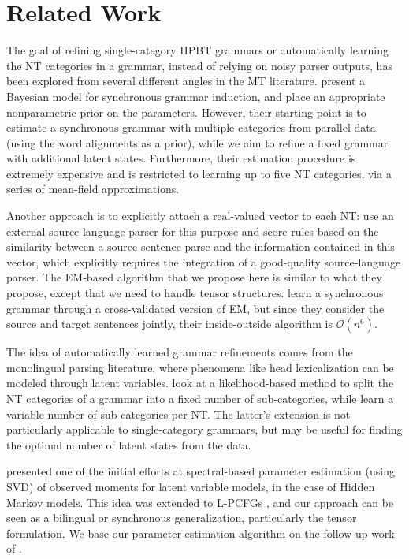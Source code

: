 \documentclass[11pt]{article}
\begin{document}
\section{Related Work}
\label{sec:related}
The goal of refining single-category HPBT grammars or automatically learning the NT categories in a grammar, instead of relying on noisy parser outputs, has been explored from several different angles in the MT literature. 
 present a Bayesian model for synchronous grammar induction, and place an appropriate nonparametric prior on the parameters. 
However, their starting point is to estimate a synchronous grammar with multiple categories from parallel data (using the word alignments as a prior), while we aim to refine a fixed grammar with additional latent states.  
Furthermore, their estimation procedure is extremely expensive and is restricted to learning up to five NT categories, via a series of mean-field approximations. 

Another approach is to explicitly attach a real-valued vector to each NT:  use an external source-language parser for this purpose and score rules based on the similarity between a source sentence parse and the information contained in this vector, which explicitly requires the integration of a good-quality source-language parser. 
The EM-based algorithm that we propose here is similar to what they propose, except that we need to handle tensor structures.  
 learn a synchronous grammar through a cross-validated version of EM, but since they consider the source and target sentences jointly, their inside-outside algorithm is $\mathcal{O}(n^6)$.  

The idea of automatically learned grammar refinements comes from the monolingual parsing literature, where phenomena like head lexicalization can be modeled through latent variables.   look at a likelihood-based method to split the NT categories of a grammar into a fixed number of sub-categories, while  learn a variable number of sub-categories per NT.  The latter's extension is not particularly applicable to single-category grammars, but may be useful for finding the optimal number of latent states from the data.  

 presented one of the initial efforts at spectral-based parameter estimation (using SVD) of observed moments for latent variable models, in the case of Hidden Markov models. 
This idea was extended to L-PCFGs \cite{cohen-14b}, and our approach can be seen as a bilingual or synchronous generalization, particularly the tensor formulation.  
We base our parameter estimation algorithm on the follow-up work of .  
\end{document}
